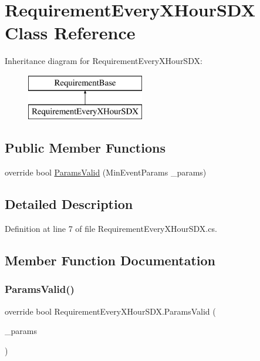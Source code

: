 \hypertarget{class_requirement_every_x_hour_s_d_x}{}\section{Requirement\+Every\+X\+Hour\+S\+DX Class Reference}
\label{class_requirement_every_x_hour_s_d_x}
Inheritance diagram for Requirement\+Every\+X\+Hour\+S\+DX\+:\begin{figure}[H]
\begin{center}
\leavevmode
\includegraphics[height=2.000000cm]{d2/d94/class_requirement_every_x_hour_s_d_x}
\end{center}
\end{figure}
\subsection*{Public Member Functions}
\begin{DoxyCompactItemize}
\item 
override bool \mbox{\hyperlink{class_requirement_every_x_hour_s_d_x_ade5438346dff0899e0a4a92500a01ffc}{Params\+Valid}} (Min\+Event\+Params \+\_\+params)
\end{DoxyCompactItemize}


\subsection{Detailed Description}


Definition at line 7 of file Requirement\+Every\+X\+Hour\+S\+D\+X.\+cs.



\subsection{Member Function Documentation}
\mbox{\label{class_requirement_every_x_hour_s_d_x_ade5438346dff0899e0a4a92500a01ffc}} 
\subsubsection{\texorpdfstring{ParamsValid()}{ParamsValid()}}
{\footnotesize\ttfamily override bool Requirement\+Every\+X\+Hour\+S\+D\+X.\+Params\+Valid (\begin{DoxyParamCaption}\item[{Min\+Event\+Params}]{\+\_\+params }\end{DoxyParamCaption})}




